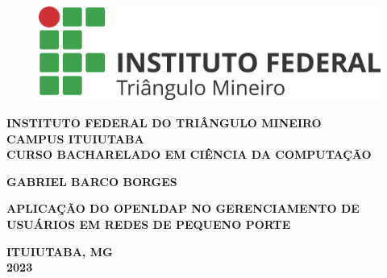 \thispagestyle{empty}

\begin{figure}
	\centering
	\includegraphics[scale=0.3]{pre-textuais/Horizontal_resumida.png}
\end{figure}

\begin{center}
\textbf{INSTITUTO FEDERAL DO TRIÂNGULO MINEIRO\\ CAMPUS ITUIUTABA\\CURSO BACHARELADO EM CIÊNCIA DA COMPUTAÇÃO}\\

\vspace*{3 cm}

\textbf{GABRIEL BARCO BORGES}\\

\vspace*{5 cm}

\textbf{\large{APLICAÇÃO DO OPENLDAP NO GERENCIAMENTO DE USUÁRIOS EM REDES DE PEQUENO PORTE}}

\vspace*{8 cm}

\textbf{ITUIUTABA, MG\\2023}
\end{center}